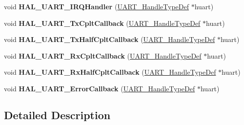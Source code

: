 \begin{DoxyCompactItemize}
\item 
\hypertarget{group___u_a_r_t___exported___functions___group2_gaad01472c507ceee3c5f2274c775ff3bf}{void {\bfseries H\-A\-L\-\_\-\-U\-A\-R\-T\-\_\-\-I\-R\-Q\-Handler} (\hyperlink{struct_u_a_r_t___handle_type_def}{U\-A\-R\-T\-\_\-\-Handle\-Type\-Def} $\ast$huart)}\label{group___u_a_r_t___exported___functions___group2_gaad01472c507ceee3c5f2274c775ff3bf}

\item 
\hypertarget{group___u_a_r_t___exported___functions___group2_gabcdf9b59049eccbc87d54042f9235b1a}{void {\bfseries H\-A\-L\-\_\-\-U\-A\-R\-T\-\_\-\-Tx\-Cplt\-Callback} (\hyperlink{struct_u_a_r_t___handle_type_def}{U\-A\-R\-T\-\_\-\-Handle\-Type\-Def} $\ast$huart)}\label{group___u_a_r_t___exported___functions___group2_gabcdf9b59049eccbc87d54042f9235b1a}

\item 
\hypertarget{group___u_a_r_t___exported___functions___group2_ga49b287e7de94cd0a38d333629298f7c4}{void {\bfseries H\-A\-L\-\_\-\-U\-A\-R\-T\-\_\-\-Tx\-Half\-Cplt\-Callback} (\hyperlink{struct_u_a_r_t___handle_type_def}{U\-A\-R\-T\-\_\-\-Handle\-Type\-Def} $\ast$huart)}\label{group___u_a_r_t___exported___functions___group2_ga49b287e7de94cd0a38d333629298f7c4}

\item 
\hypertarget{group___u_a_r_t___exported___functions___group2_gae494a9643f29b87d6d81e5264e60e57b}{void {\bfseries H\-A\-L\-\_\-\-U\-A\-R\-T\-\_\-\-Rx\-Cplt\-Callback} (\hyperlink{struct_u_a_r_t___handle_type_def}{U\-A\-R\-T\-\_\-\-Handle\-Type\-Def} $\ast$huart)}\label{group___u_a_r_t___exported___functions___group2_gae494a9643f29b87d6d81e5264e60e57b}

\item 
\hypertarget{group___u_a_r_t___exported___functions___group2_ga1884970cc493d8efba5aec28c0d526e7}{void {\bfseries H\-A\-L\-\_\-\-U\-A\-R\-T\-\_\-\-Rx\-Half\-Cplt\-Callback} (\hyperlink{struct_u_a_r_t___handle_type_def}{U\-A\-R\-T\-\_\-\-Handle\-Type\-Def} $\ast$huart)}\label{group___u_a_r_t___exported___functions___group2_ga1884970cc493d8efba5aec28c0d526e7}

\item 
\hypertarget{group___u_a_r_t___exported___functions___group2_ga0e0456ea96d55db31de947fb3e954f18}{void {\bfseries H\-A\-L\-\_\-\-U\-A\-R\-T\-\_\-\-Error\-Callback} (\hyperlink{struct_u_a_r_t___handle_type_def}{U\-A\-R\-T\-\_\-\-Handle\-Type\-Def} $\ast$huart)}\label{group___u_a_r_t___exported___functions___group2_ga0e0456ea96d55db31de947fb3e954f18}

\end{DoxyCompactItemize}


\subsection{Detailed Description}
